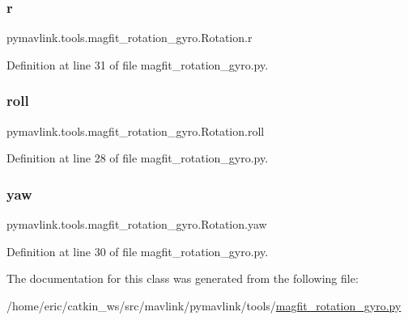 \subsubsection{\texorpdfstring{r}{r}}
{\footnotesize\ttfamily pymavlink.\+tools.\+magfit\+\_\+rotation\+\_\+gyro.\+Rotation.\+r}



Definition at line 31 of file magfit\+\_\+rotation\+\_\+gyro.\+py.

\mbox{\label{classpymavlink_1_1tools_1_1magfit__rotation__gyro_1_1Rotation_a87366b9bb41c2b076b1bbe7a4fefb3c7}} 
\subsubsection{\texorpdfstring{roll}{roll}}
{\footnotesize\ttfamily pymavlink.\+tools.\+magfit\+\_\+rotation\+\_\+gyro.\+Rotation.\+roll}



Definition at line 28 of file magfit\+\_\+rotation\+\_\+gyro.\+py.

\mbox{\label{classpymavlink_1_1tools_1_1magfit__rotation__gyro_1_1Rotation_a042cd272704a4136a52a3889f9e77266}} 
\subsubsection{\texorpdfstring{yaw}{yaw}}
{\footnotesize\ttfamily pymavlink.\+tools.\+magfit\+\_\+rotation\+\_\+gyro.\+Rotation.\+yaw}



Definition at line 30 of file magfit\+\_\+rotation\+\_\+gyro.\+py.



The documentation for this class was generated from the following file\+:\begin{DoxyCompactItemize}
\item 
/home/eric/catkin\+\_\+ws/src/mavlink/pymavlink/tools/\mbox{\hyperlink{magfit__rotation__gyro_8py}{magfit\+\_\+rotation\+\_\+gyro.\+py}}\end{DoxyCompactItemize}
